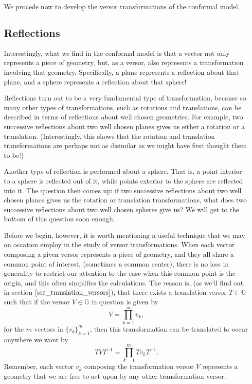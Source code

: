 \documentclass[12pt]{article}
\newcommand{\G}{\mathbb{G}}
\begin{document}
We procede now to develop the versor transformations of the conformal model.

\subsection{Reflections}\label{sec_reflections}

Interestingly, what we find in the conformal model is that a vector
not only represents a piece of geometry, but, as a versor, also represents
a transformation involving that geometry.  Specifically, a plane represents
a reflection about that plane, and a sphere represents a reflection about that
sphere!

Reflections turn out to be a very fundamental type of transformation, because
so many other types of transformations, such as rotations and translations, can be described
in terms of reflections about well chosen geometries.  For example, two
successive reflections about two well chosen planes gives us either a rotation
or a translation.  (Interestingly, this shows that the rotation and translation
transformations are perhaps not as disimilar as we might have first thought them to be!)

Another type of reflection is performed about a sphere.  That is, a point
interior to a sphere is reflected out of it, while points exterior to the sphere
are reflected into it.  The question then comes up: if two successive
reflections about two well chosen planes gives us the rotation or
translation transformations, what does two successive reflections about
two well chosen spheres give us?  We will get to the bottom of this question soon enough.

Before we begin, however, it is worth mentioning a useful technique that we may
on occation employ in the study of versor transformations.  When each vector
composing a given versor represents a piece of geometry, and they all share
a common point of interest, (sometimes a common center), there is no loss
in generality to restrict our attention to the case when this common point
is the origin, and this often simplifies the calculations.
The reason is, (as we'll find out in section $\eqref{sec_translation_versors}$),
that there exists a translation versor $T\in\G$ such that if the versor $V\in\G$ in question
is given by
\begin{equation*}
V = \prod_{k=1}^m v_k,
\end{equation*}
for the $m$ vectors in $\{v_k\}_{k=1}^m$, then this transformation can be translated
to occur anywhere we want by
\begin{equation*}
TVT^{-1} = \prod_{k=1}^m Tv_kT^{-1}.
\end{equation*}
Remember, each vector $v_k$ composing the transformation versor $V$ represents a geometry
that we are free to act upon by any other transformation versor.
\end{document}
